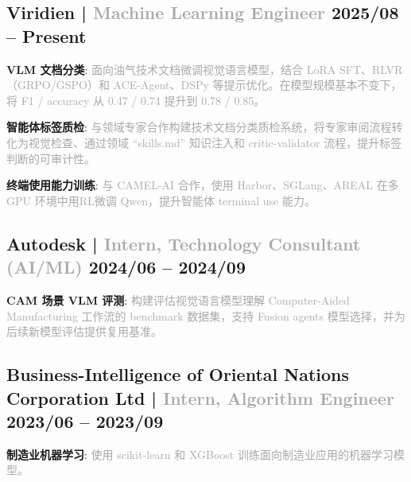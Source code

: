 \subsection{{Viridien | \textcolor{darkgray}{Machine Learning Engineer} \hfill 2025/08 -- Present}}
\begin{zitemize}
\item \textbf{VLM 文档分类}: \textcolor{darkgray}{面向油气技术文档微调视觉语言模型，结合 LoRA SFT、RLVR（GRPO/GSPO）和 ACE-Agent、DSPy 等提示优化。在模型规模基本不变下，将 F1 / accuracy 从 0.47 / 0.74 提升到 0.78 / 0.85。}
\item \textbf{智能体标签质检}: \textcolor{darkgray}{与领域专家合作构建技术文档分类质检系统，将专家审阅流程转化为视觉检查、通过领域 ``skills.md'' 知识注入和 critic-validator 流程，提升标签判断的可审计性。}
\item \textbf{终端使用能力训练}: \textcolor{darkgray}{与 CAMEL-AI 合作，使用 Harbor、SGLang、AREAL 在多 GPU 环境中用RL微调 Qwen，提升智能体 terminal use 能力。}
\end{zitemize}

\subsection{{Autodesk | \textcolor{darkgray}{Intern, Technology Consultant (AI/ML)} \hfill 2024/06 -- 2024/09}}
\begin{zitemize}
\item \textbf{CAM 场景 VLM 评测}: \textcolor{darkgray}{构建评估视觉语言模型理解 Computer-Aided Manufacturing 工作流的 benchmark 数据集，支持 Fusion agents 模型选择，并为后续新模型评估提供复用基准。}
\end{zitemize}

\subsection{{Business-Intelligence of Oriental Nations Corporation Ltd | \textcolor{darkgray}{Intern, Algorithm Engineer} \hfill 2023/06 -- 2023/09}}
\begin{zitemize}
\item \textbf{制造业机器学习}: \textcolor{darkgray}{使用 scikit-learn 和 XGBoost 训练面向制造业应用的机器学习模型。}
\end{zitemize}
